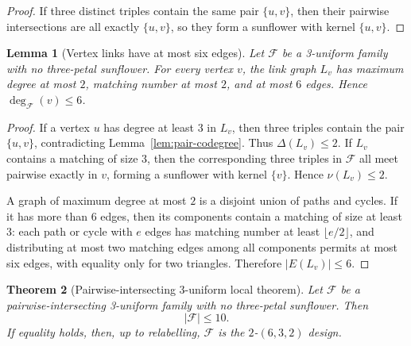 \documentclass[11pt]{article}
\newtheorem{theorem}{Theorem}[section]
\newtheorem{lemma}[theorem]{Lemma}
\newcommand{\F}{\mathcal F}
\begin{document}
\begin{proof}
If three distinct triples contain the same pair $\{u,v\}$, then their
pairwise intersections are all exactly $\{u,v\}$, so they form a sunflower
with kernel $\{u,v\}$.
\end{proof}

\begin{lemma}[Vertex links have at most six edges]
\label{lem:degree-six}
Let $\F$ be a 3-uniform family with no three-petal sunflower.  For every
vertex $v$, the link graph $L_v$ has maximum degree at most $2$, matching
number at most $2$, and at most $6$ edges.  Hence $\deg_{\F}(v)\le 6$.
\end{lemma}

\begin{proof}
If a vertex $u$ has degree at least $3$ in $L_v$, then three triples contain
the pair $\{u,v\}$, contradicting Lemma~\ref{lem:pair-codegree}.  Thus
$\Delta(L_v)\le 2$.  If $L_v$ contains a matching of size $3$, then the
corresponding three triples in $\F$ all meet pairwise exactly in $v$, forming
a sunflower with kernel $\{v\}$.  Hence $\nu(L_v)\le 2$.

A graph of maximum degree at most $2$ is a disjoint union of paths and cycles.
If it has more than $6$ edges, then its components contain a matching of size
at least $3$: each path or cycle with $e$ edges has matching number at least
$\lfloor e/2\rfloor$, and distributing at most two matching edges among all
components permits at most six edges, with equality only for two triangles.
Therefore $|E(L_v)|\le 6$.
\end{proof}

\begin{theorem}[Pairwise-intersecting 3-uniform local theorem]
\label{thm:pairwise-ten}
Let $\F$ be a pairwise-intersecting 3-uniform family with no three-petal
sunflower.  Then
\[
  |\F|\le 10.
\]
If equality holds, then, up to relabelling, $\F$ is the $2$-$(6,3,2)$ design.
\end{theorem}
\end{document}
